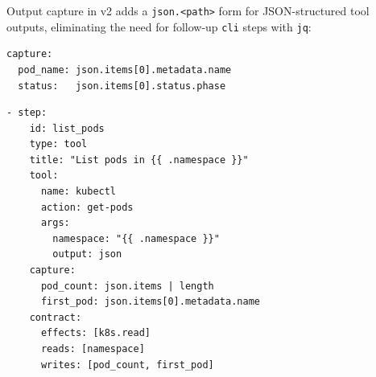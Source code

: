 Output capture in v2 adds a \texttt{json.<path>} form for JSON-structured tool
outputs, eliminating the need for follow-up \texttt{cli} steps with \texttt{jq}:

\begin{verbatim}
capture:
  pod_name: json.items[0].metadata.name
  status:   json.items[0].status.phase
\end{verbatim}

\begin{verbatim}
- step:
    id: list_pods
    type: tool
    title: "List pods in {{ .namespace }}"
    tool:
      name: kubectl
      action: get-pods
      args:
        namespace: "{{ .namespace }}"
        output: json
    capture:
      pod_count: json.items | length
      first_pod: json.items[0].metadata.name
    contract:
      effects: [k8s.read]
      reads: [namespace]
      writes: [pod_count, first_pod]
\end{verbatim}

